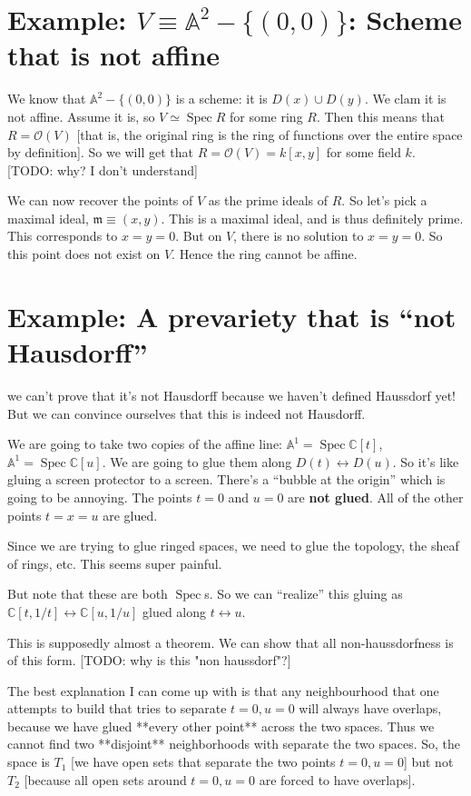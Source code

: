 \documentclass{book}
\newcommand{\C}{\ensuremath{\mathbb{C}}}
\newcommand{\A}{\ensuremath{\mathbb{A}}}
\renewcommand{\O}{\ensuremath{\mathcal{O}}}
\newcommand{\Spec}{\operatorname{Spec}}
\newcommand{\spec}{\operatorname{Spec}}
\newcommand{\m}{\mathfrak{m}}
\theoremstyle{definition}
\begin{document}
\section{Example: $V \equiv \A^2 - \{(0, 0)\}$: Scheme that is not affine}
We know that $\A^2 - \{(0, 0)\}$ is a scheme: it is $D(x) \cup D(y)$. 
We clam it is not affine. Assume it is, so $V \simeq \spec R$ for some ring $R$.
Then this means that $R = \O(V)$ [that is, the original ring is the ring
of functions over the entire space by definition]. So we will get 
that $R = \O(V) = k[x, y]$ for some field $k$. [TODO: why? I don't understand]

We can now recover the points of $V$ as the prime ideals of $R$. So let's
pick a maximal ideal, $\m \equiv (x, y)$. This is a maximal ideal, and
is thus definitely prime. This corresponds to $x = y = 0$. But on $V$,
there is no solution to $x = y = 0$. So this point does not exist on $V$.
Hence the ring cannot be affine.

\section{Example: A prevariety that is ``not Hausdorff''}
we can't prove that it's not Hausdorff because we haven't defined Haussdorf yet!
But we can convince ourselves that this is indeed not Hausdorff.

We are going to take two copies of
the affine line: $\A^1 =  \Spec \C[t]$, $\A^1 = \Spec \C[u]$.
We are going to glue them along $D(t) \leftrightarrow D(u)$. So it's
like gluing a screen protector to a screen. There's a ``bubble at the origin''
which is going to be annoying. The points $t = 0$ and $u = 0$ are
\textbf{not glued}.  All of the other points $t = x = u$ are glued.

Since we are trying to glue ringed spaces, we need to glue the topology,
the sheaf of rings, etc. This seems super painful. 


But note that these are both $\Spec$s. So we can ``realize'' this gluing
as $\C[t, 1/t] \leftrightarrow \C[u, 1/u]$ glued along $t \leftrightarrow u$.

This is supposedly almost a theorem. We can show that all non-haussdorfness
is of this form. [TODO: why is this "non haussdorf"?]


The best explanation I can come up with is that any neighbourhood that one
attempts to build that tries to separate $t = 0, u = 0$ will always have
overlaps, because we have glued **every other point** across the two spaces.
Thus we cannot find two **disjoint** neighborhoods with separate the two
spaces. So, the space is $T_1$ [we have open sets that separate the two
points $t = 0, u = 0$] but not $T_2$ [because all open sets around
$t=0, u=0$ are forced to have overlaps].
\end{document}
